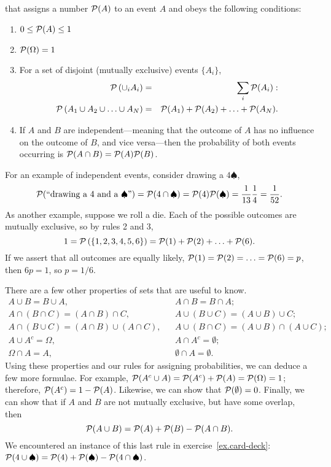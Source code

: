  that assigns a number $\mathcal{P}(A)$ to an event $A$ and obeys the following conditions:
\begin{enumerate}
\item\label{prob.range} $0\le\mathcal{P}(A) \le 1$
\item\label{prob.complete} $\mathcal{P}(\Omega) = 1$
\item\label{prob.disjoint} For a set of disjoint (mutually exclusive) events $\{A_{i}\}$,
\begin{eqnarray*}
 \mathcal{P}\left(\cup_{i}A_{i}\right) &=& \sum_{i}\mathcal{P}(A_{i}):\\
 \mathcal{P}\left(A_{1}\cup A_{2}\cup\ldots\cup A_{N}\right) &=&
 	\mathcal{P}(A_{1})+\mathcal{P}(A_{2}) +\ldots+\mathcal{P}(A_{N}).
\end{eqnarray*}
\item\label{prob.independent} If $A$ and $B$ are independent---meaning that the outcome of $A$ has no influence on the outcome of $B$, and vice versa---then the probability of both events occurring is $\mathcal{P}(A\cap B) = \mathcal{P}(A)\mathcal{P}(B)$.
\end{enumerate}
For an example of independent events, consider drawing a $4\spadesuit$,
\[
 \mathcal{P}(\textrm{``drawing a 4 and a $\spadesuit$''}) = \mathcal{P}(4\cap\spadesuit) = \mathcal{P}(4)\mathcal{P}(\spadesuit) = \frac{1}{13}\frac{1}{4} = \frac{1}{52}.
 \]
As another example, suppose we roll a die. Each of the possible outcomes are mutually exclusive, so by rules 2 and 3,
\[
	1 = \mathcal{P}\left(\{1,2,3,4,5,6\}\right) = \mathcal{P}(1) + \mathcal{P}(2) +\ldots+\mathcal{P}(6).
\]
If we assert that all outcomes are equally likely, $\mathcal{P}(1)=\mathcal{P}(2)=\ldots=\mathcal{P}(6)=p$, then $6p = 1$, so $p = 1/6$.

There are a few other properties of sets that are useful to know.
\begin{eqnarray*}
	A\cup B = B\cup A, && A\cap B = B\cap A;\\
	A\cap(B\cap C) = (A\cap B)\cap C, && A\cup(B\cup C) = (A\cup B)\cup C;\\
	A\cap(B\cup C) = (A\cap B)\cup(A\cap C), && A\cup(B\cap C) = (A\cup B)\cap(A\cup C);\\
	A\cup A^{c} = \Omega, && A\cap A^{c} = \emptyset;\\
	\Omega\cap A = A, && \emptyset\cap A = \emptyset.
\end{eqnarray*}
Using these properties and our rules for assigning probabilities, we can deduce a few more formulae. For example, $\mathcal{P}(A^{c}\cup A) =  \mathcal{P}(A^{c}) + \mathcal{P}(A) = \mathcal{P}(\Omega) = 1$; therefore, $\mathcal{P}(A^{c}) = 1-\mathcal{P}(A)$.  Likewise, we can show that $\mathcal{P}(\emptyset)=0$.  
Finally, we can show that if $A$ and $B$ are not mutually exclusive, but have some overlap, then
\[ \mathcal{P}(A\cup B) = \mathcal{P}(A)+\mathcal{P}(B) - \mathcal{P}(A\cap B). \]
We encountered an instance of this last rule in exercise~\ref{ex.card-deck}: $\mathcal{P}(4\cup\spadesuit) = \mathcal{P}(4)+\mathcal{P}(\spadesuit) - \mathcal{P}(4\cap\spadesuit)$.

